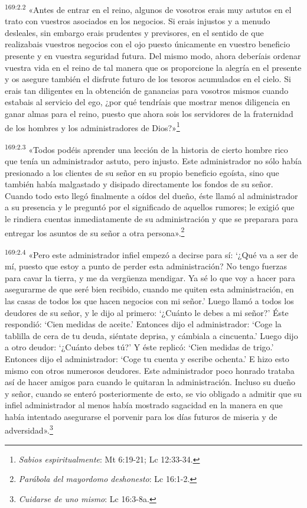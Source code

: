 \par
\textsuperscript{169:2.2} «Antes de entrar en el reino, algunos de vosotros erais muy astutos en el trato con vuestros asociados en los negocios. Si erais injustos y a menudo desleales, sin embargo erais prudentes y previsores, en el sentido de que realizabais vuestros negocios con el ojo puesto únicamente en vuestro beneficio presente y en vuestra seguridad futura. Del mismo modo, ahora deberíais ordenar vuestra vida en el reino de tal manera que os proporcione la alegría en el presente y os asegure también el disfrute futuro de los tesoros acumulados en el cielo. Si erais tan diligentes en la obtención de ganancias para vosotros mismos cuando estabais al servicio del ego, ¿por qué tendríais que mostrar menos diligencia en ganar almas para el reino, puesto que ahora sois los servidores de la fraternidad de los hombres y los administradores de Dios?»\footnote{\textit{Sabios espiritualmente}: Mt 6:19-21; Lc 12:33-34.}

\par
\textsuperscript{169:2.3} «Todos podéis aprender una lección de la historia de cierto hombre rico que tenía un administrador astuto, pero injusto. Este administrador no sólo había presionado a los clientes de su señor en su propio beneficio egoísta, sino que también había malgastado y disipado directamente los fondos de su señor. Cuando todo esto llegó finalmente a oídos del dueño, éste llamó al administrador a su presencia y le preguntó por el significado de aquellos rumores; le exigió que le rindiera cuentas inmediatamente de su administración y que se preparara para entregar los asuntos de su señor a otra persona».\footnote{\textit{Parábola del mayordomo deshonesto}: Lc 16:1-2.}

\par
\textsuperscript{169:2.4} «Pero este administrador infiel empezó a decirse para sí: `¿Qué va a ser de mí, puesto que estoy a punto de perder esta administración? No tengo fuerzas para cavar la tierra, y me da verg\"uenza mendigar. Ya sé lo que voy a hacer para asegurarme de que seré bien recibido, cuando me quiten esta administración, en las casas de todos los que hacen negocios con mi señor.' Luego llamó a todos los deudores de su señor, y le dijo al primero: `¿Cuánto le debes a mi señor?' Éste respondió: `Cien medidas de aceite.' Entonces dijo el administrador: `Coge la tablilla de cera de tu deuda, siéntate deprisa, y cámbiala a cincuenta.' Luego dijo a otro deudor: `¿Cuánto debes tú?' Y éste replicó: `Cien medidas de trigo.' Entonces dijo el administrador: `Coge tu cuenta y escribe ochenta.' E hizo esto mismo con otros numerosos deudores. Este administrador poco honrado trataba así de hacer amigos para cuando le quitaran la administración. Incluso su dueño y señor, cuando se enteró posteriormente de esto, se vio obligado a admitir que su infiel administrador al menos había mostrado sagacidad en la manera en que había intentado asegurarse el porvenir para los días futuros de miseria y de adversidad».\footnote{\textit{Cuidarse de uno mismo}: Lc 16:3-8a.}

